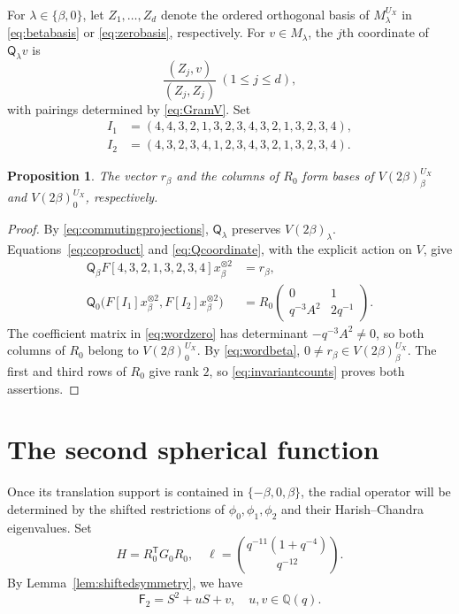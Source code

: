 \documentclass[12pt,reqno]{amsart}
\theoremstyle{plain}
\newtheorem{proposition}[theorem]{Proposition}
\theoremstyle{definition}
\numberwithin{equation}{section}
\newcommand{\kk}{\mathbb Q(q)}
\newcommand{\tens}{\otimes}
\begin{document}
For $\lambda\in\{\beta,0\}$, let $Z_1,\ldots,Z_d$ denote the
ordered orthogonal basis of $M_\lambda^{U_X}$ in
\eqref{eq:betabasis} or \eqref{eq:zerobasis}, respectively.
For $v\in M_\lambda$, the $j$th coordinate of $\mathsf Q_\lambda v$ is
\begin{equation}\label{eq:Qcoordinate}
	\frac{(Z_j,v)}{(Z_j,Z_j)}
	\ (1\leq j\leq d),
\end{equation}
with pairings determined by \eqref{eq:GramV}.
Set
\begin{align*}
	I_1&=(4,4,3,2,1,3,2,3,4,3,2,1,3,2,3,4),\\
	I_2&=(4,3,2,3,4,1,2,3,4,3,2,1,3,2,3,4).
\end{align*}

\begin{proposition}\label{prop:smallspaces}
	The vector $r_\beta$ and the columns of $R_0$ form bases of
	$V(2\beta)_\beta^{U_X}$ and $V(2\beta)_0^{U_X}$, respectively.
\end{proposition}

\begin{proof}
	By \eqref{eq:commutingprojections}, $\mathsf Q_\lambda$ preserves
	$V(2\beta)_\lambda$.
	Equations~\eqref{eq:coproduct} and \eqref{eq:Qcoordinate},
	with the explicit action on $V$, give
	\begin{align}
		\mathsf Q_\beta F[4,3,2,1,3,2,3,4]x_\beta^{\tens2}
		&=r_\beta,\label{eq:wordbeta}\\
		\mathsf Q_0\bigl(F[I_1]x_\beta^{\tens2},F[I_2]x_\beta^{\tens2}\bigr)
		&=R_0
		\begin{pmatrix}
			0&1\\ q^{-3}A^2&2q^{-1}
		\end{pmatrix}.
		\label{eq:wordzero}
	\end{align}
	The coefficient matrix in \eqref{eq:wordzero} has determinant
	$-q^{-3}A^2\ne0$, so both columns of $R_0$ belong to
	$V(2\beta)_0^{U_X}$.
	By \eqref{eq:wordbeta}, $0\ne r_\beta\in V(2\beta)_\beta^{U_X}$.
	The first and third rows of $R_0$ give rank $2$, so
	\eqref{eq:invariantcounts} proves both assertions.
\end{proof}


\section{The second spherical function}\label{sec:second}

Once its translation support is contained in $\{-\beta,0,\beta\}$,
the radial operator will be determined by the shifted restrictions
of $\phi_0,\phi_1,\phi_2$ and their Harish--Chandra eigenvalues.
Set
\begin{equation}\label{eq:smallGram}
	H=R_0^{\mathsf T}G_0R_0,\quad
	\boldsymbol{\ell}=\binom{q^{-11}(1+q^{-4})}{q^{-12}}.
\end{equation}
By Lemma~\ref{lem:shiftedsymmetry}, we have
\begin{equation}\label{eq:secondsphere}
	\mathsf{F}_2=S^2+uS+v,\quad u,v\in\kk.
\end{equation}
\end{document}
